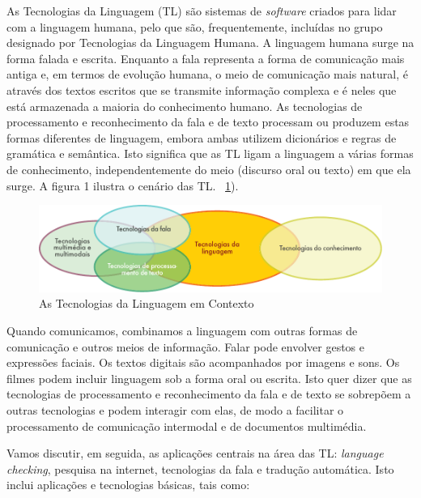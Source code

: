 \begin{multicols}{2}

  As Tecnologias da Linguagem (TL) são sistemas de \textit{software} criados para lidar com a linguagem humana, pelo que são, frequentemente, incluídas no grupo designado por Tecnologias da Linguagem Humana. A linguagem humana surge na forma falada e escrita. Enquanto a fala representa a forma de comunicação mais antiga e, em termos de evolução humana, o meio de comunicação mais natural, é através dos textos escritos que se transmite informação complexa e é neles que está armazenada a maioria do conhecimento humano. As tecnologias de processamento e reconhecimento da fala e de texto processam ou produzem estas formas diferentes de linguagem, embora ambas utilizem dicionários e regras de gramática e semântica. Isto significa que as TL ligam a linguagem a várias formas de conhecimento, independentemente do meio (discurso oral ou texto) em que ela surge. A figura 1 ilustra o cenário das TL. ~\ref{fig:ltincontext_de}).

\begin{figure}[htb]
  \center
  \includegraphics[width=\textwidth]{../_media/portuguese/language_technologies}
  \caption{As Tecnologias da Linguagem em Contexto}
  \label{fig:ltincontext_de}
\end{figure}

Quando comunicamos, combinamos a linguagem com outras formas de comunicação e outros meios de informação. Falar pode envolver gestos e expressões faciais. Os textos digitais são acompanhados por imagens e sons. Os filmes podem incluir linguagem sob a forma oral ou escrita. Isto quer dizer que as tecnologias de processamento e reconhecimento da fala e de texto se sobrepõem a outras tecnologias e podem interagir com elas, de modo a facilitar o processamento de comunicação intermodal e de documentos multimédia.

Vamos discutir, em seguida, as aplicações centrais na área das TL: \textit{language checking}, pesquisa na internet, tecnologias da fala e tradução automática. Isto inclui aplicações e tecnologias básicas, tais como:


\end{multicols}
